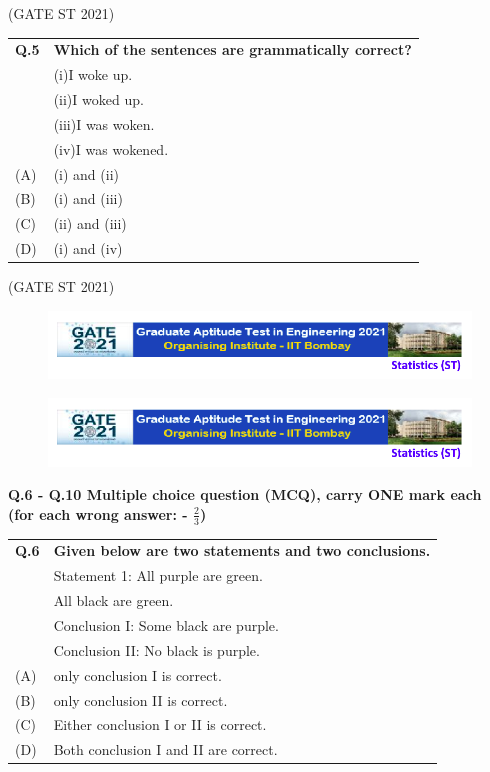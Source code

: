 \documentclass[journal,12pt,onecolumn]{IEEEtran}
\theoremstyle{remark}
\begin{document}
\bigskip
\hfill (GATE ST 2021)
\\

\Large\begin{tabular}{|p{1cm}|p{12.5cm}|} 
\hline
\textbf{Q.5} & \textbf{Which of the sentences are grammatically correct?} \\   &(i)I woke up.\\  & (ii)I woked up.\\ & (iii)I was woken.\\ & (iv)I was wokened.\\
\hline
(A) & (i) and (ii) \\
\hline
(B) & (i) and (iii) \\
\hline
(C) & (ii) and (iii) \\
\hline
(D) & (i) and (iv) \\
\hline
\end{tabular}

\bigskip
\hfill (GATE ST 2021)
\\

\begin{figure}
\huge\centering
    \includegraphics[width=1\linewidth]{figs/0.png}
\end{figure}
 \newpage
 
 \begin{figure}
\huge\centering
    \includegraphics[width=1\linewidth]{figs/0.png}
\end{figure}

\Large\textbf{Q.6 - Q.10 Multiple choice question (MCQ), carry ONE mark each (for each wrong answer: - $\frac{2}{3}$)} 

\bigskip

\begin{tabular}{|p{1cm}|p{12.5cm}|}
\hline
\textbf{Q.6} &  \textbf{Given below are two statements and two conclusions.}\\ & Statement 1: All purple are green. \\ & All black are green. \\ & Conclusion I: Some black are purple. \\ & Conclusion II: No black is purple.\\
\hline
(A) & only conclusion I is correct. \\
\hline
(B) & only conclusion II is correct. \\
\hline
(C) & Either conclusion I or II is correct. \\
\hline
(D) & Both conclusion I and II are correct. \\
\hline
\end{tabular}
\end{document}
